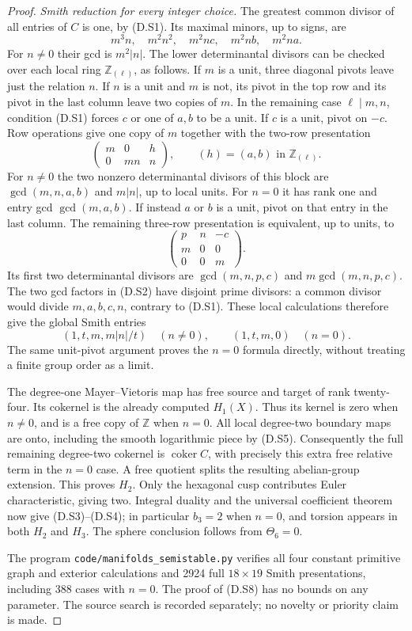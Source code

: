\begin{proof}
\emph{Smith reduction for every integer choice.}
The greatest common divisor of all entries of $C$ is one,
by (D.S1). Its maximal minors, up to signs, are
\[
 m^3n,\quad m^2n^2,\quad m^2nc,\quad m^2nb,\quad m^2na.
\]
For $n\ne0$ their gcd is $m^2|n|$.
The lower determinantal divisors can be checked over each
local ring $\mathbb Z_{(\ell)}$, as follows.
If $m$ is a unit, three diagonal pivots leave just the
relation $n$.
If $n$ is a unit and $m$ is not, its pivot in the top row
and its pivot in the last column leave two copies of $m$.
In the remaining case $\ell\mid m,n$, condition (D.S1)
forces $c$ or one of $a,b$ to be a unit.
If $c$ is a unit, pivot on $-c$. Row operations give one
copy of $m$ together with the two-row presentation
\[
 \begin{pmatrix}m&0&h\\0&mn&n\end{pmatrix},
 \qquad (h)=(a,b)\text{ in }\mathbb Z_{(\ell)}.
\]
For $n\ne0$ the two nonzero determinantal divisors of this block
are $\gcd(m,n,a,b)$ and $m|n|$, up to local units.
For $n=0$ it has rank one and entry gcd $\gcd(m,a,b)$.
If instead $a$ or $b$ is a unit, pivot on that entry in
the last column. The remaining three-row presentation is
equivalent, up to units, to
\[
 \begin{pmatrix}p&n&-c\\m&0&0\\0&0&m\end{pmatrix}.
\]
Its first two determinantal divisors are
$\gcd(m,n,p,c)$ and $m\gcd(m,n,p,c)$.
The two gcd factors in (D.S2) have disjoint prime divisors:
a common divisor would divide $m,a,b,c,n$, contrary to
(D.S1). These local calculations therefore give the global
Smith entries
\[
 (1,t,m,m|n|/t)\quad(n\ne0),\qquad
 (1,t,m,0)\quad(n=0).
 \tag{D.S8}
\]
The same unit-pivot argument proves the $n=0$ formula
directly, without treating a finite group order as a limit.

The degree-one Mayer--Vietoris map has free source and
target of rank twenty-four. Its cokernel is the already
computed $H_1(X)$. Thus its kernel is zero when $n\ne0$,
and is a free copy of $\mathbb Z$ when $n=0$.
All local degree-two boundary maps are onto, including
the smooth logarithmic piece by (D.S5).
Consequently the full remaining degree-two cokernel is
$\operatorname{coker} C$, with precisely this extra free
relative term in the $n=0$ case. A free quotient splits
the resulting abelian-group extension. This proves $H_2$.
Only the hexagonal cusp contributes Euler characteristic,
giving two. Integral duality and the universal coefficient
theorem now give (D.S3)--(D.S4); in particular $b_3=2$
when $n=0$, and torsion appears in both $H_2$ and $H_3$.
The sphere conclusion follows from $\Theta_6=0$.

The program \texttt{code/manifolds\_semistable.py} verifies
all four constant primitive graph and exterior calculations
and 2924 full $18\times19$ Smith presentations, including
388 cases with $n=0$. The proof of (D.S8) has no bounds
on any parameter. The source search is recorded separately;
no novelty or priority claim is made.
\end{proof}

